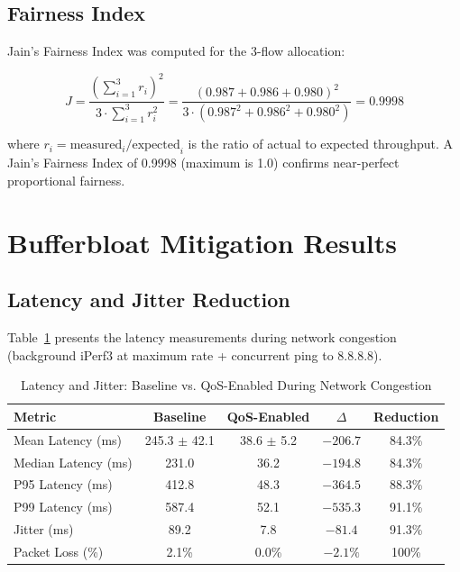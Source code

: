 \subsection{Fairness Index}

Jain's Fairness Index was computed for the 3-flow allocation:

\begin{equation}
J = \frac{\left(\sum_{i=1}^{3} r_i\right)^2}{3 \cdot \sum_{i=1}^{3} r_i^2} = \frac{(0.987 + 0.986 + 0.980)^2}{3 \cdot (0.987^2 + 0.986^2 + 0.980^2)} = 0.9998
\end{equation}

\noindent where $r_i = \text{measured}_i / \text{expected}_i$ is the ratio of actual to expected throughput. A Jain's Fairness Index of 0.9998 (maximum is 1.0) confirms near-perfect proportional fairness.

\section{Bufferbloat Mitigation Results}
\label{sec:results_bufferbloat}

\subsection{Latency and Jitter Reduction}

Table~\ref{tab:latency_results} presents the latency measurements during network congestion (background iPerf3 at maximum rate + concurrent ping to 8.8.8.8).

\begin{table}[H]
\centering
\caption{Latency and Jitter: Baseline vs. QoS-Enabled During Network Congestion}
\label{tab:latency_results}
\begin{tabular}{lcccc}
\toprule
\textbf{Metric} & \textbf{Baseline} & \textbf{QoS-Enabled} & \textbf{$\Delta$} & \textbf{Reduction} \\
\midrule
Mean Latency (ms)   & 245.3 $\pm$ 42.1 & 38.6 $\pm$ 5.2  & $-206.7$ & 84.3\% \\
Median Latency (ms) & 231.0            & 36.2             & $-194.8$ & 84.3\% \\
P95 Latency (ms)    & 412.8            & 48.3             & $-364.5$ & 88.3\% \\
P99 Latency (ms)    & 587.4            & 52.1             & $-535.3$ & 91.1\% \\
Jitter (ms)         & 89.2             & 7.8              & $-81.4$  & 91.3\% \\
Packet Loss (\%)    & 2.1\%            & 0.0\%            & $-2.1\%$ & 100\%  \\
\bottomrule
\end{tabular}
\end{table}

